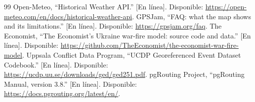 \documentclass[journal,10pt]{IEEEtran}
\begin{document}
\begin{thebibliography}{99}
 Open-Meteo, ``Historical Weather API.'' [En línea]. Disponible: \url{https://open-meteo.com/en/docs/historical-weather-api}.
 GPSJam, ``FAQ: what the map shows and its limitations.'' [En línea]. Disponible: \url{https://gpsjam.org/faq}.
 The Economist, ``The Economist's Ukraine war-fire model: source code and data.'' [En línea]. Disponible: \url{https://github.com/TheEconomist/the-economist-war-fire-model}.
 Uppsala Conflict Data Program, ``UCDP Georeferenced Event Dataset Codebook.'' [En línea]. Disponible: \url{https://ucdp.uu.se/downloads/ged/ged251.pdf}.
 pgRouting Project, ``pgRouting Manual, version 3.8.'' [En línea]. Disponible: \url{https://docs.pgrouting.org/latest/en/}.
\end{thebibliography}
\end{document}
